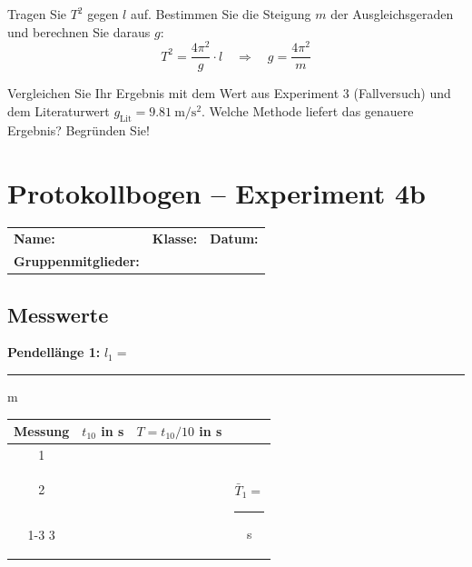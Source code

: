 \documentclass[11pt,a4paper]{scrartcl}
\begin{document}
	\begin{aufgabe}[title={\faIcon{pencil-alt} Aufgabe 4: Grafische Auswertung}]
		Tragen Sie $T^2$ gegen $l$ auf. Bestimmen Sie die Steigung $m$ der Ausgleichsgeraden und berechnen Sie daraus $g$:
		\[T^2 = \frac{4\pi^2}{g} \cdot l \quad \Rightarrow \quad g = \frac{4\pi^2}{m}\]
	\end{aufgabe}
	
	\begin{sternaufgabe}[title={\faIcon{star} Aufgabe 5: Methodenvergleich}]
		Vergleichen Sie Ihr Ergebnis mit dem Wert aus Experiment 3 (Fallversuch) und dem Literaturwert $g_{\text{Lit}} = \SI{9,81}{\metre\per\second\squared}$. Welche Methode liefert das genauere Ergebnis? Begründen Sie!
	\end{sternaufgabe}
	
	\newpage
	\section*{Protokollbogen -- Experiment 4b}
	
	\begin{center}
		\begin{tcolorbox}[colback=white, colframe=black, width=\textwidth, boxrule=0.5pt]
			\begin{tabular}{@{}p{0.32\textwidth}p{}p{}@{}}
				\textbf{Name:} \hrulefill & \textbf{Klasse:} \hrulefill & \textbf{Datum:} \hrulefill \\[0.4cm]
				\textbf{Gruppenmitglieder:} & \multicolumn{2}{l}{\hrulefill} \\
			\end{tabular}
		\end{tcolorbox}
	\end{center}
	
	\subsection*{Messwerte}
	
	\textbf{Pendellänge 1:} $l_1 = $ \rule{3cm}{0.4pt} m
	
	\vspace{0.2cm}
	
	\begin{center}
		\renewcommand{\arraystretch}{2.2}
		\begin{tabular}{|c|c|c|c|}
			\hline
			\textbf{Messung} & $t_{10}$ in s & $T = t_{10}/10$ in s & \\
			\hline
			1 & & & \\
			\hline
			2 & & & \multirow{2}{*}{$\bar{T}_1 = $ \rule{2cm}{0.4pt} s} \\
			\cline{1-3}
			3 & & & \\
			\hline
		\end{tabular}
	\end{center}
	
\end{document}
